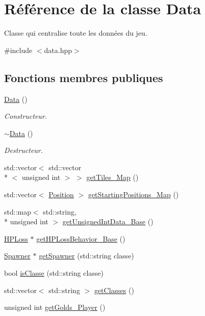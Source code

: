 \hypertarget{classData}{\section{Référence de la classe Data}
\label{classData}
}


Classe qui centralise toute les données du jeu.  




{\ttfamily \#include $<$data.\+hpp$>$}

\subsection*{Fonctions membres publiques}
\begin{DoxyCompactItemize}
\item 
\hypertarget{classData_af11f741cb7f587e2e495452a8905a22a}{\hyperlink{classData_af11f741cb7f587e2e495452a8905a22a}{Data} ()}\label{classData_af11f741cb7f587e2e495452a8905a22a}

\begin{DoxyCompactList}\small\item\em Constructeur. \end{DoxyCompactList}\item 
\hypertarget{classData_aab31956423290f0d62dcca47ab4d16dd}{\hyperlink{classData_aab31956423290f0d62dcca47ab4d16dd}{$\sim$\+Data} ()}\label{classData_aab31956423290f0d62dcca47ab4d16dd}

\begin{DoxyCompactList}\small\item\em Destructeur. \end{DoxyCompactList}\item 
std\+::vector$<$ std\+::vector\\*
$<$ unsigned int $>$ $>$ \hyperlink{classData_afa20d9cff2f1a3e174b7afcfb5a324fe}{get\+Tiles\+\_\+\+Map} ()
\item 
std\+::vector$<$ \hyperlink{classPosition}{Position} $>$ \hyperlink{classData_a37701a5ef2e31ae2b0c7a78ac943e316}{get\+Starting\+Positions\+\_\+\+Map} ()
\item 
std\+::map$<$ std\+::string, \\*
unsigned int $>$ \hyperlink{classData_a28356240fd39ccba1e700b903c4bec95}{get\+Unsigned\+Int\+Data\+\_\+\+Base} ()
\item 
\hyperlink{classHPLoss}{H\+P\+Loss} $\ast$ \hyperlink{classData_ac3ee5887346af353d837b0cd989e86df}{get\+H\+P\+Loss\+Behavior\+\_\+\+Base} ()
\item 
\hyperlink{classSpawner}{Spawner} $\ast$ \hyperlink{classData_ae1e9282b13a0c50cd3e25da0de4527ac}{get\+Spawner} (std\+::string classe)
\item 
bool \hyperlink{classData_ad3fadb201a8698fee0981d7567024b23}{is\+Classe} (std\+::string classe)
\item 
std\+::vector$<$ std\+::string $>$ \hyperlink{classData_a6da2bc0e5b92dd41c3e3cae7440c2a1d}{get\+Classes} ()
\item 
unsigned int \hyperlink{classData_a24b4103d5c16ef50f996e2e058ee41e2}{get\+Golds\+\_\+\+Player} ()
\end{DoxyCompactItemize}


